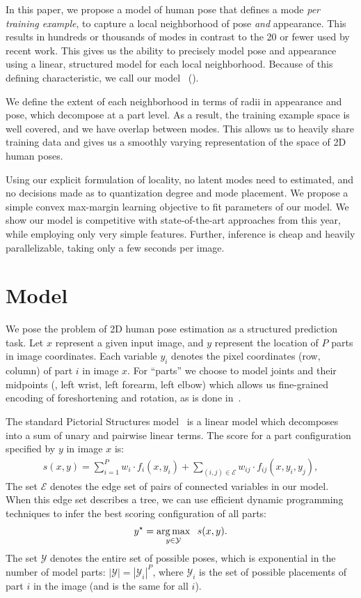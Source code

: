  In this paper, we propose a model of human pose that 
defines a mode {\em per training example}, to capture a local neighborhood of
pose {\em and } appearance.  This results in hundreds or thousands of modes in 
contrast to the 20 or fewer used by recent work. This gives us the ability to 
precisely model pose and appearance using a linear, structured model for each 
local neighborhood.  Because of this defining characteristic, we call our model 
\LLPSlong~(\LLPS).

We define the extent of each neighborhood in terms of radii in appearance and 
pose, which decompose at a part level.  As a result, the training example space 
is well covered, and we have overlap between modes.  This allows us to heavily 
share training data and gives us a smoothly varying representation of the space 
of 2D human poses.

Using our explicit formulation of locality, no latent modes need to estimated, 
and no decisions made as to quantization degree and mode placement.  We propose 
a simple convex max-margin learning objective to fit parameters of our model.  
We show our model is competitive with state-of-the-art approaches from this 
year, while employing only very simple features. Further, inference is cheap 
and heavily parallelizable, taking only a few seconds per image.


\section{Model}\label{sec:model}

We pose the problem of 2D human pose estimation as a structured prediction task.  Let $x$ represent a given input image, and $y$ represent the location of $P$ parts in image coordinates.  Each variable $y_i$ denotes the pixel coordinates (row, column) of part $i$ in image $x$.  For ``parts'' we choose to model joints and their midpoints (\eg, left wrist, left forearm, left elbow) which allows us fine-grained encoding of foreshortening and rotation, as is done in~\cite{deva2011,sapp2011}.

The standard Pictorial Structures model~\cite{felzps} is a linear model which decomposes into a sum of unary and pairwise linear terms.  The score for a part configuration specified by $y$ in image $x$ is:
\begin{align}
 s(x,y) = \sum_{i=1}^P w_i \cdot f_i(x,y_i) + \sum_{(i,j) \in \mathcal{E}} w_{ij} \cdot f_{ij}(x,y_i,y_j),
 \label{eqn:ps}
 \end{align}
The set $\mathcal{E}$ denotes the edge set of pairs of connected variables in our model.  When this edge set describes a tree, we can use efficient dynamic programming techniques to infer the best scoring configuration of all parts:
\begin{align}
y^\star = \mathop{\arg\max}_{y \in \mathcal{Y}} \;\;s(x,y).
\end{align}
The set $\mathcal{Y}$ denotes the entire set of possible poses, which is exponential in the number of model parts: $|\mathcal{Y}| = |\mathcal{Y}_i|^P$, where $\mathcal{Y}_i$ is the set of possible placements of part $i$ in the image (and is the same for all $i$).

